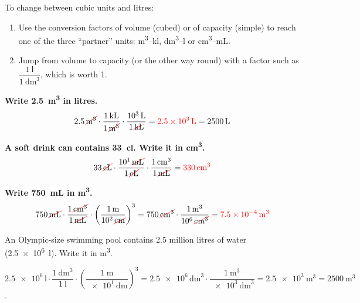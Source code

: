 \begin{impt}
    To change between cubic units and litres:
    \begin{enumerate}[label=\numberballmDarkTeal]
        \item Use the conversion factors of volume (cubed) or of capacity (simple) to reach one of the three ``partner'' units: \unit{\cubic\m}--\unit{\kilo\litre}, \unit{\cubic\dm}--\unit{\litre} or \unit{\cubic\cm}--\unit{\mL}.
        \item Jump from volume to capacity (or the other way round) with a factor such as \(\dfrac{\qty{1}{\litre}}{\qty{1}{\cubic\dm}}\), which is worth 1.
    \end{enumerate}
\end{impt}

\begin{example}
    \textbf{Write \qty{2.5}{\cubic\m} in litres.}
    \begin{equation*}
        \num{2.5}\,\cancelunit{\cubic\m} \cdot \dfrac{\qty{1}{\kilo\litre}}{1\,\cancelunit{\cubic\m}} \cdot \dfrac{\qty{e3}{\litre}}{1\,\cancelunit{\kilo\litre}} = \textcolor{red}{\qty{2.5e3}{\litre}} = \qty{2500}{\litre}
    \end{equation*}
\end{example}

\begin{example}
    \textbf{A soft drink can contains \qty{33}{\centi\litre}. Write it in \unit{\cubic\cm}.}
    \begin{equation*}
        \num{33}\,\cancelunit{\centi\litre} \cdot \dfrac{\num{e1}\,\cancelunit{\mL}}{1\,\cancelunit{\centi\litre}} \cdot \dfrac{\qty{1}{\cubic\cm}}{1\,\cancelunit{\mL}} = \textcolor{red}{\qty{330}{\cubic\cm}}
    \end{equation*}
\end{example}

\begin{example}
    \textbf{Write \qty{750}{\mL} in \unit{\cubic\m}.}
    \begin{equation*}
        \num{750}\,\cancelunit{\mL} \cdot \dfrac{1\,\cancelunit{\cubic\cm}}{1\,\cancelunit{\mL}} \cdot \left(\dfrac{\qty{1}{\m}}{\num{e2}\,\cancelunit{\cm}}\right)^{3}
        = \num{750}\,\cancelunit{\cubic\cm} \cdot \dfrac{\qty{1}{\cubic\m}}{\num{e6}\,\cancelunit{\cubic\cm}} = \textcolor{red}{\qty{7.5e-4}{\cubic\m}}
    \end{equation*}
\end{example}

\begin{exercise}
    An Olympic-size swimming pool contains 2.5 million litres of water (\qty{2.5e6}{\litre}). Write it in \unit{\cubic\metre}.
    \begin{solu}
        \(\num{2.5e6}\,\unit{\litre} \cdot \dfrac{\qty{1}{\cubic\dm}}{\qty{1}{\litre}} \cdot \left(\dfrac{\qty{1}{\m}}{\qty{e1}{\dm}}\right)^{3} = \num{2.5e6}\,\unit{\cubic\dm} \cdot \dfrac{\qty{1}{\cubic\m}}{\qty{e3}{\cubic\dm}} = \qty{2.5e3}{\cubic\m} = \qty{2500}{\cubic\m}\).
    \end{solu}
\end{exercise}

